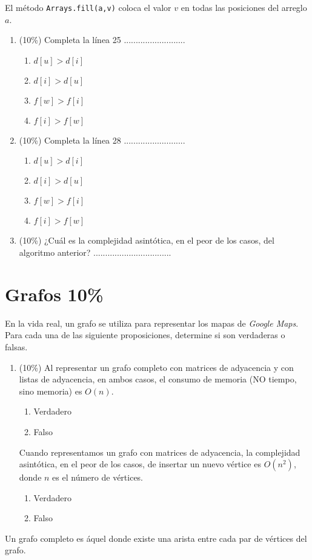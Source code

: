 \documentclass[10 pt]{article}
\begin{document}
\begin{multicols}{2}
El método \texttt{Arrays.fill(a,v)} coloca el valor $v$ en todas las posiciones del arreglo $a$.

\begin{enumerate}[label=\Alph*]
	\item (10\%) Completa la línea 25 ..........................
  \begin{enumerate}
    \item $d[u] > d[i]$
    \item $d[i] > d[u]$
    \item $f[w] > f[i]$
    \item $f[i] > f[w]$
  \end{enumerate}  
 \item (10\%) Completa la línea 28 ..........................
 \begin{enumerate}
    \item $d[u] > d[i]$
    \item $d[i] > d[u]$
    \item $f[w] > f[i]$
    \item $f[i] > f[w]$
  \end{enumerate}  

	\item (10\%) ¿Cuál es la complejidad asintótica, en el peor de los casos, del algoritmo anterior? .................................
\end{enumerate}



\section{Grafos 10\%}
En la vida real, un grafo se utiliza para representar los mapas de \emph{Google Maps}. 
Para cada una de las siguiente proposiciones, determine si son verdaderas o falsas.
\begin{enumerate}[label=\Alph*]
  \item (10\%) Al representar un grafo completo con matrices de adyacencia y con listas de adyacencia, en ambos casos, el consumo de memoria (NO tiempo, sino memoria) es $O(n)$.
  \begin{enumerate}
    \item Verdadero
    \item Falso
  \end{enumerate}
  Cuando representamos un grafo con matrices de adyacencia, la complejidad asintótica, en el peor de los casos, de insertar un nuevo vértice es $O(n^2)$,  donde $n$ es el número de vértices.
  \begin{enumerate}
    \item Verdadero
    \item Falso
  \end{enumerate}
\end{enumerate}

Un grafo completo es áquel donde existe una arista entre cada par de vértices del grafo. 


\end{multicols}
\end{document}
